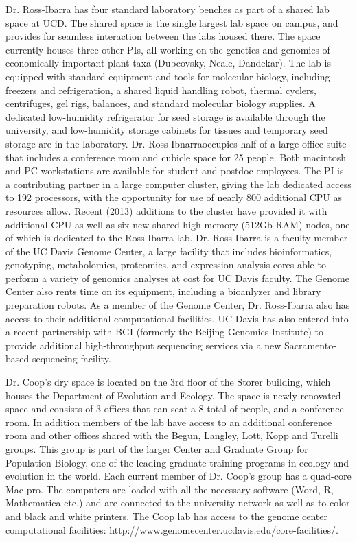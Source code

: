 Dr. Ross-Ibarra has four standard laboratory benches as part of a shared lab space at UCD.  The shared space is the single largest lab space on campus, and provides for seamless interaction between the labs housed there.  The space currently houses three other PIs, all working on the genetics and genomics of economically important plant taxa (Dubcovsky, Neale, Dandekar). The lab is equipped with standard equipment and tools for molecular biology, including freezers and refrigeration, a shared liquid handling robot, thermal cyclers, centrifuges, gel rigs, balances, and standard molecular biology supplies.  A dedicated low-humidity refrigerator for seed storage is available through the university, and low-humidity storage cabinets for tissues and temporary seed storage are in the laboratory. Dr. Ross-Ibnarraoccupies half of a large office suite that includes a conference room and cubicle space for 25 people.  Both macintosh and PC workstations are available for student and postdoc employees. The PI is a contributing partner in a large computer cluster, giving the lab dedicated access to 192 processors, with the opportunity for use of nearly 800 additional CPU as resources allow. Recent (2013) additions to the cluster have provided it with additional CPU as well as six new shared high-memory (512Gb RAM) nodes, one of which is dedicated to the Ross-Ibarra lab. Dr. Ross-Ibarra is a faculty member of the UC Davis Genome Center, a large facility that includes bioinformatics, genotyping, metabolomics, proteomics, and expression analysis cores able to perform a variety of genomics analyses at cost for UC Davis faculty. The Genome Center also rents time on its equipment, including a bioanlyzer and library preparation robots. As a member of the Genome Center, Dr. Ross-Ibarra also has access to their additional computational facilities. UC Davis has also entered into a recent partnership with BGI (formerly the Beijing Genomics Institute) to provide additional high-throughput sequencing services via a new Sacramento-based sequencing facility.

Dr. Coop's dry space is located on the 3rd floor of the Storer building, which houses the Department of Evolution and Ecology. The space is newly renovated space and consists of 3 offices that can seat a 8 total of people, and a conference room. In addition members of the lab have access to an additional conference room and other offices shared with the Begun, Langley, Lott, Kopp and Turelli groups. This group is part of the larger Center and Graduate Group for Population Biology, one of the leading graduate training programs in ecology and evolution in the world. Each current member of Dr. Coop’s group has a quad-core Mac pro. The computers are loaded with all the necessary software (Word, R, Mathematica etc.) and are connected to the university network as well as to color and black and white printers. The Coop lab has access to the genome center computational facilities: http://www.genomecenter.ucdavis.edu/core-facilities/. 

